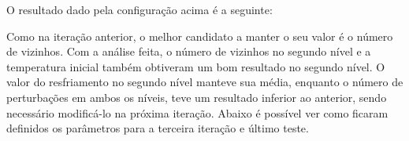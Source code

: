 \documentclass[
	12pt,				%
	openright,			%
	twoside,			%
	a4paper,			%
	english,			%
	french,				%
	spanish,			%
	brazil				%
	]{abntex2}
\begin{document}
O resultado dado pela configuração acima é a seguinte:

\begin{table}[ht]
	\centering
	\caption{Candidatos a parâmetros na segunda iteração}
	\label{candidatos_parametros_2}
\end{table}

Como na iteração anterior, o melhor candidato a manter o seu valor é o número de vizinhos. Com a análise feita, o número de vizinhos no segundo nível e a temperatura inicial também obtiveram um bom resultado no segundo nível. O valor do resfriamento no segundo nível manteve sua média, enquanto o número de perturbações em ambos os níveis, teve um resultado inferior ao anterior, sendo necessário modificá-lo na próxima iteração. Abaixo é possível ver como ficaram definidos os parâmetros para a terceira iteração e último teste.
\end{document}
